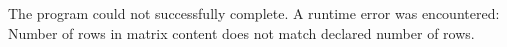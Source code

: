 The program could not successfully complete.
A runtime error was encountered:
Number of rows in matrix content does not match declared number of rows.
